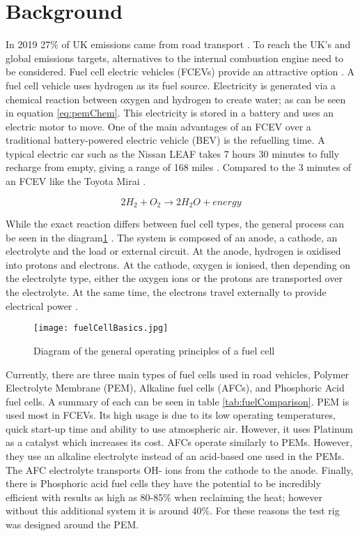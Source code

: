 \documentclass[a4paper,11pt]{article}
\begin{document}
\section{Background}


In 2019 27\% of UK emissions came from road transport \cite{waite2019emissions}. To reach the UK's and global emissions targets, alternatives to the internal combustion engine need to be considered. Fuel cell electric vehicles (FCEVs) provide an attractive option \cite{yoshida2015toyota}. A fuel cell vehicle uses hydrogen as its fuel source. Electricity is generated via a chemical reaction between oxygen and hydrogen to create water; as can be seen in equation \ref{eq:pemChem}. This electricity is stored in a battery and uses an electric motor to move. One of the main advantages of an FCEV over a traditional battery-powered electric vehicle (BEV) is the refuelling time. A typical electric car such as the Nissan LEAF takes 7 hours 30 minutes to fully recharge from empty, giving a range of 168 miles \cite{Nissan2022Elec}. Compared to the 3 minutes of an FCEV like the Toyota Mirai \cite{yoshida2015toyota}. 

\begin{equation} \label{eq:pemChem}
    2H_{2} + O_2 \rightarrow 2H_{2}O + energy
\end{equation}

While the exact reaction differs between fuel cell types, the general process can be seen in the diagram\ref{fig:fuelCellBasic} \cite{Mark2003SolidOxide}. The system is composed of an anode, a cathode, an electrolyte and the load or external circuit. At the anode, hydrogen is oxidised into protons and electrons. At the cathode, oxygen is ionised, then depending on the electrolyte type, either the oxygen ions or the protons are transported over the electrolyte. At the same time, the electrons travel externally to provide electrical power \cite{Mark2003SolidOxide}.


\begin{figure}[h!]
    \texttt{[image: fuelCellBasics.jpg]}
    \caption{Diagram of the general operating principles of a fuel cell \cite{Mark2003SolidOxide}}
    \label{fig:fuelCellBasic}
    \centering  
\end{figure}

Currently, there are three main types of fuel cells used in road vehicles, Polymer Electrolyte Membrane (PEM), Alkaline fuel cells (AFCs), and Phosphoric Acid fuel cells. A summary of each can be seen in table \ref{tab:fuelComparison}. PEM is used most in FCEVs. Its high usage is due to its low operating temperatures, quick start-up time and ability to use atmospheric air\cite{deloitte2020FuelCell}. However, it uses Platinum as a catalyst which increases its cost. AFCs operate similarly to PEMs. However, they use an alkaline electrolyte instead of an acid-based one used in the PEMs. The AFC electrolyte transports OH- ions from the cathode to the anode. Finally, there is Phosphoric acid fuel cells they have the potential to be incredibly efficient with results as high as 80-85\% when reclaiming the heat\cite{doe2006factsheet}; however without this additional system it is around 40\%. For these reasons the test rig was designed around the PEM.
\end{document}
